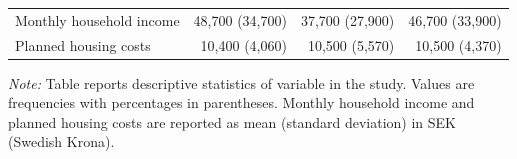 \begin{table}[H]
\begin{threeparttable}
\begin{tabular}[t]{lrrr}
Monthly household income & 48,700 (34,700) & 37,700 (27,900) & 46,700 (33,900) \\
Planned housing costs & 10,400 (4,060) & 10,500 (5,570) & 10,500 (4,370) \\
\bottomrule
\end{tabular}

\begin{tablenotes}[flushleft]
\scriptsize
\item \textit{Note:} Table reports descriptive statistics of variable in the study. Values are frequencies with percentages in parentheses. Monthly household income and planned housing costs are reported as mean (standard deviation) in SEK (Swedish Krona).
\end{tablenotes}
\end{threeparttable}
\end{table}
